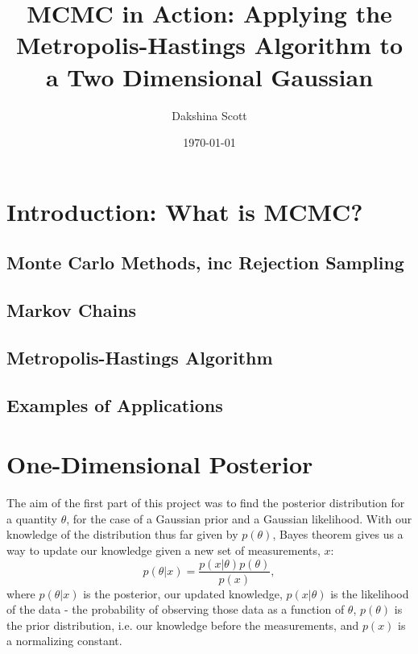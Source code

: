\documentclass[a4paper,11pt,twoside]{article}
\begin{document}
 
\title{MCMC in Action: Applying the Metropolis-Hastings Algorithm to a Two
Dimensional Gaussian}

\date{\today} 
\author{Dakshina Scott} 
\maketitle

\begin{abstract} 
\end{abstract}

\tableofcontents

\section{Introduction: What is MCMC?} 
\subsection{Monte Carlo Methods, inc Rejection Sampling}

\subsection{Markov Chains} 
\subsection{Metropolis-Hastings Algorithm}
\subsection{Examples of Applications}

\section{One-Dimensional Posterior} 
The aim of the first part of this project was to find the posterior
distribution for a quantity $\theta$, for the case of a Gaussian prior and a
Gaussian likelihood. With our knowledge
of the distribution thus far given by $p(\theta)$, Bayes theorem gives us a way
to update our knowledge given a new set of measurements, $x$: 
\begin{equation}
	\label{eq:bayes}
	p(\theta|x) = \frac{p(x|\theta)p(\theta)}{p(x)},
\end{equation} 
where $p(\theta|x)$ is the posterior, our updated knowledge,
$p(x|\theta)$ is the likelihood of the data - the probability of observing
those data as a function of $\theta$, $p(\theta)$ is the prior distribution,
i.e. our knowledge before the measurements, and $p(x)$ is a normalizing
constant.
\end{document}

